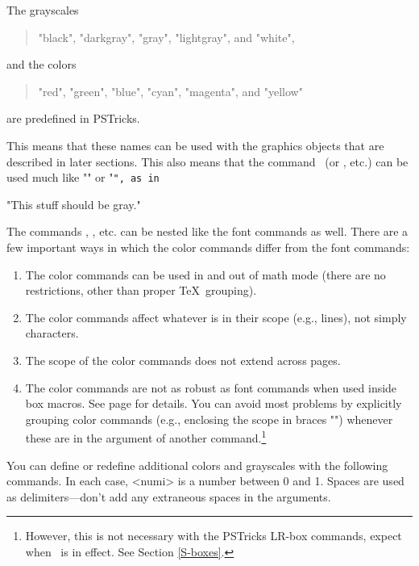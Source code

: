 
The grayscales
\begin{quote}
  "black", "darkgray", "gray", "lightgray", and "white",
\end{quote}
and the colors
\begin{quote}
  "red", "green", "blue", "cyan", "magenta", and "yellow"
\end{quote}
are predefined in PSTricks.

This means that these names can be used with the graphics objects that are
described in later sections. This also means that the command \n\gray\ (or
\n\red, etc.) can be used much like "\rm" or "\tt", as in
\begin{Ex}
  \gray\Large"{\gray This stuff should be gray.}"
\end{Ex}
The commands \n\gray, \n\red, etc. can be nested like the font commands as
well. There are a few important ways in which the color commands differ from
the font commands:
\begin{enumerate}
\item The color commands can be used in and out of math mode (there are no
restrictions, other than proper \TeX\ grouping).

\item The color commands affect whatever is in their scope (e.g., lines), not
simply characters.

\item The scope of the color commands does not extend across pages.

\item The color commands are not as robust as font commands when used inside
box macros. See page \pageref{colorboxproblems} for details. You can avoid
most problems by explicitly grouping color commands (e.g., enclosing the scope
in braces "{}") whenever these are in the argument of another
command.\footnote{However, this is not necessary with the PSTricks LR-box
commands, expect when \n\psverbboxtrue\ is in effect. See Section
\ref{S-boxes}.}

\end{enumerate}

You can define or redefine additional colors and grayscales with the following
commands. In each case, <numi> is a number between 0 and 1. Spaces are used as
delimiters---don't add any extraneous spaces in the arguments.

